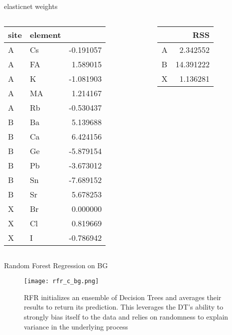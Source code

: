 \documentclass[10pt, compress]{beamer}
\begin{document}
\begin{frame}[label={sec:org6452e0d}]{elasticnet weights}
\begin{columns}
\begin{column}{0.7\columnwidth}
\begin{center}
\begin{tabular}{llr}
site & element & \\
\hline
A & Cs & -0.191057\\
A & FA & 1.589015\\
A & K & -1.081903\\
A & MA & 1.214167\\
A & Rb & -0.530437\\
B & Ba & 5.139688\\
B & Ca & 6.424156\\
B & Ge & -5.879154\\
B & Pb & -3.673012\\
B & Sn & -7.689152\\
B & Sr & 5.678253\\
X & Br & 0.000000\\
X & Cl & 0.819669\\
X & I & -0.786942\\
\end{tabular}
\end{center}
\end{column}
\begin{column}{0.3\columnwidth}
\begin{center}
\begin{tabular}{lr}
 & RSS\\
\hline
A & 2.342552\\
B & 14.391222\\
X & 1.136281\\
\end{tabular}
\end{center}
\end{column}
\end{columns}
\end{frame}

\begin{frame}[allowframebreaks]{Random Forest Regression on BG}
\begin{figure}[htbp]
\centering
\texttt{[image: rfr\_c\_bg.png]}
\caption{RFR initializes an ensemble of Decision Trees and averages their results to return its prediction. This leverages the DT's ability to strongly bias itself to the data and relies on randomness to explain variance in the underlying process}
\end{figure}
\end{frame}
\end{document}
